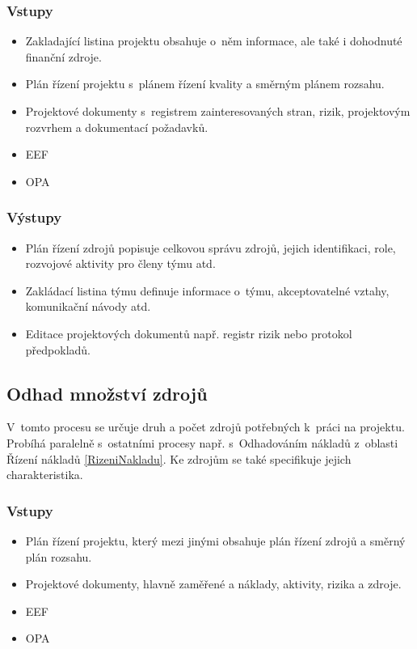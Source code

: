 \subsubsection*{Vstupy}
\begin{itemize}
    \item Zakladající listina projektu obsahuje o~něm informace, ale také i dohodnuté finanční zdroje.
    \item Plán řízení projektu s~plánem řízení kvality a směrným plánem rozsahu.
    \item Projektové dokumenty s~registrem zainteresovaných stran, rizik, projektovým rozvrhem a dokumentací požadavků.
    \item EEF
    \item OPA
\end{itemize}
\subsubsection*{Výstupy}
\begin{itemize}
    \item Plán řízení zdrojů popisuje celkovou správu zdrojů, jejich identifikaci, role, rozvojové aktivity pro členy týmu atd.  
    \item Zakládací listina týmu definuje informace o~týmu, akceptovatelné vztahy, komunikační návody atd.
    \item Editace projektových dokumentů např. registr rizik nebo protokol předpokladů.
\end{itemize}

\subsection*{Odhad množství zdrojů}

V~tomto procesu se určuje druh a počet zdrojů potřebných k~práci na projektu. Probíhá paralelně s~ostatními procesy např. s~Odhadováním nákladů z~oblasti Řízení nákladů \ref{RizeniNakladu}. Ke zdrojům se také specifikuje jejich charakteristika.

\subsubsection*{Vstupy}
\begin{itemize}
    \item Plán řízení projektu, který mezi jinými obsahuje plán řízení zdrojů a směrný plán rozsahu.
    \item Projektové dokumenty, hlavně zaměřené a náklady, aktivity, rizika a zdroje.
    \item EEF
    \item OPA
\end{itemize}
